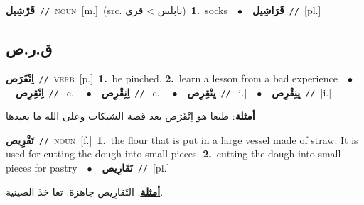 \documentclass[10pt,a4paper,twoside]{article} %
\begin{document}
\begin{multicols}{2}
{\setlength\topsep{0pt}\textbf{\foreignlanguage{arabic}{قَرْشِيل}}\ {\color{gray}\texttt{//}\color{black}}\ \textsc{noun}\ [m.]\ (src. \color{gray}\foreignlanguage{arabic}{نابلس > قرى}\color{black})\ \textbf{1.}~socks\ \ $\bullet$\ \ \setlength\topsep{0pt}\textbf{\foreignlanguage{arabic}{قَرَاشِيل}}\ {\color{gray}\texttt{//}\color{black}}\ [pl.]\ } \vspace{2mm}

\vspace{-3mm}
\subsection*{\color{blue}\foreignlanguage{arabic}{ق.ر.ص}\color{blue}{}} 

{\setlength\topsep{0pt}\textbf{\foreignlanguage{arabic}{اِنْقَرَص}}\ {\color{gray}\texttt{//}\color{black}}\ \textsc{verb}\ [p.]\ \textbf{1.}~be pinched.  \textbf{2.}~learn a lesson from a bad experience\ \ $\bullet$\ \ \setlength\topsep{0pt}\textbf{\foreignlanguage{arabic}{اِنْقِرِص}}\ {\color{gray}\texttt{//}\color{black}}\ [c.]\ \ $\bullet$\ \ \setlength\topsep{0pt}\textbf{\foreignlanguage{arabic}{اِنِقْرِص}}\ {\color{gray}\texttt{//}\color{black}}\ [c.]\ \ $\bullet$\ \ \setlength\topsep{0pt}\textbf{\foreignlanguage{arabic}{يِنْقِرِص}}\ {\color{gray}\texttt{//}\color{black}}\ [i.]\ \ $\bullet$\ \ \setlength\topsep{0pt}\textbf{\foreignlanguage{arabic}{يِنِقْرِص}}\ {\color{gray}\texttt{//}\color{black}}\ [i.]\  \begin{flushright}\color{gray}\foreignlanguage{arabic}{\textbf{\underline{\foreignlanguage{arabic}{أمثلة}}}: طبعا هو اِنْقَرَص بعد قصة الشيكات وعلى الله ما يعيدها}\end{flushright}\color{black}} \vspace{2mm}

{\setlength\topsep{0pt}\textbf{\foreignlanguage{arabic}{تَقْرِيص}}\ {\color{gray}\texttt{//}\color{black}}\ \textsc{noun}\ [f.]\ \textbf{1.}~the flour that is put in a large vessel made of straw. It is used for cutting the dough into small pieces.  \textbf{2.}~cutting the dough into small pieces for pastry\ \ $\bullet$\ \ \setlength\topsep{0pt}\textbf{\foreignlanguage{arabic}{تَقَارِيص}}\ {\color{gray}\texttt{//}\color{black}}\ [pl.]\  \begin{flushright}\color{gray}\foreignlanguage{arabic}{\textbf{\underline{\foreignlanguage{arabic}{أمثلة}}}: التَقارِيص جاهزة. تعا خذ الصينية.}\end{flushright}\color{black}} \vspace{2mm}


\end{multicols}
\end{document}
